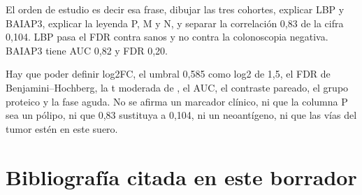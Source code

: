 \documentclass[11pt]{article}
\begin{document}
El orden de estudio es decir esa frase, dibujar las tres cohortes, explicar LBP y BAIAP3, explicar la leyenda P, M y N, y separar la correlación 0,83 de la cifra 0,104. LBP pasa el FDR contra sanos y no contra la colonoscopia negativa. BAIAP3 tiene AUC 0,82 y FDR 0,20.

Hay que poder definir log2FC, el umbral 0,585 como log2 de 1,5, el FDR de Benjamini--Hochberg, la t moderada de \cite{smyth2004,mccarthy2009}, el AUC, el contraste pareado, el grupo proteico y la fase aguda. No se afirma un marcador clínico, ni que la columna P sea un pólipo, ni que 0,83 sustituya a 0,104, ni un neoantígeno, ni que las vías del tumor estén en este suero.

\section{Bibliografía citada en este borrador}
\end{document}
